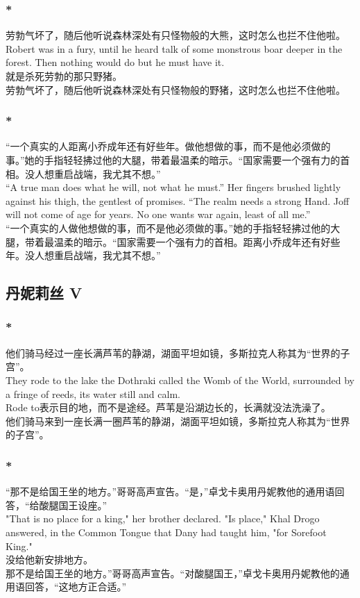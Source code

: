 \documentclass[12pt,a4paper]{article}
\newcommand{\h}[1]{{\color{red}#1}\\}
\newcommand{\la}[1]{{\color{blue}#1}\\}
\begin{document}
\subsubsection{\color{red}*}\la{
	劳勃气坏了，随后他听说森林深处有只怪物般的大熊，这时怎么也拦不住他啦。\\
	Robert was in a fury, until he heard talk of some monstrous boar deeper in the forest. Then nothing would do but he must have it.}\h{
	就是杀死劳勃的那只野猪。}
	劳勃气坏了，随后他听说森林深处有只怪物般的野猪，这时怎么也拦不住他啦。
	
\subsubsection{\color{red}*}\la{
	“一个真实的人距离小乔成年还有好些年。做他想做的事，而不是他必须做的事。”她的手指轻轻拂过他的大腿，带着最温柔的暗示。“国家需要一个强有力的首相。没人想重启战端，我尤其不想。”\\
	“A true man does what he will, not what he must.” Her fingers brushed lightly against his thigh, the gentlest of promises. “The realm needs a strong Hand. Joff will not come of age for years. No one wants war again, least of all me.”}
	“一个真实的人做他想做的事，而不是他必须做的事。”她的手指轻轻拂过他的大腿，带着最温柔的暗示。“国家需要一个强有力的首相。距离小乔成年还有好些年。没人想重启战端，我尤其不想。”
		
\subsection{丹妮莉丝 V}
\subsubsection{\color{red}*}\la{
	他们骑马经过一座长满芦苇的静湖，湖面平坦如镜，多斯拉克人称其为“世界的子宫”。\\
	They rode to the lake the Dothraki called the Womb of the World, surrounded by a fringe of reeds, its water still and calm. }\h{
	Rode to表示目的地，而不是途经。芦苇是沿湖边长的，长满就没法洗澡了。}
	他们骑马来到一座长满一圈芦苇的静湖，湖面平坦如镜，多斯拉克人称其为“世界的子宫”。
	
\subsubsection{\color{red}*}\la{	
	“那不是给国王坐的地方。”哥哥高声宣告。“是，”卓戈卡奥用丹妮教他的通用语回答，“给酸腿国王设座。”\\
	"That is no place for a king," her brother declared. "Is place," Khal Drogo answered, in the Common Tongue that Dany had taught him, "for Sorefoot King."}\h{
	没给他新安排地方。}
	那不是给国王坐的地方。”哥哥高声宣告。“对酸腿国王，”卓戈卡奥用丹妮教他的通用语回答，“这地方正合适。”
	
\end{document}
